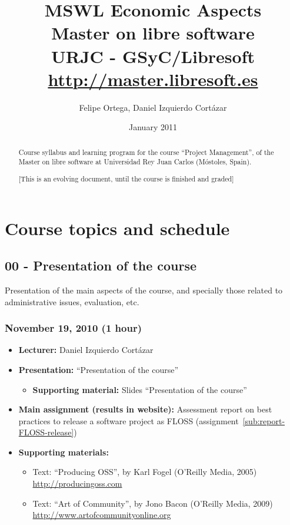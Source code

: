 \documentclass[a4paper]{article}
\title{MSWL Economic Aspects \\
Master on libre software \\
URJC - GSyC/Libresoft \\
\url{http://master.libresoft.es}}
\author{Felipe Ortega, Daniel Izquierdo Cortázar}
\date{January 2011}
\begin{document}
\maketitle

\begin{abstract}
Course syllabus and learning program for the course ``Project Management'', of the Master on libre software at Universidad Rey Juan Carlos (Móstoles, Spain).

[This is an evolving document, until the course is finished and graded]
\end{abstract}

\tableofcontents

\section{Course topics and schedule}

\subsection{00 - Presentation of the course}

Presentation of the main aspects of the course, and specially those related to administrative issues, evaluation, etc.

\subsubsection{November 19, 2010 (1 hour)}

\begin{itemize}
\item \textbf{Lecturer:} Daniel Izquierdo Cortázar
\item \textbf{Presentation:} ``Presentation of the course''
  \begin{itemize}
  \item \textbf{Supporting material:} Slides ``Presentation of the course''
  \end{itemize}
\item \textbf{Main assignment (results in website):} Assessment report on best practices to release a software project as FLOSS (assignment~\ref{sub:report-FLOSS-release})

\item \textbf{Supporting materials:} 
  \begin{itemize}
  \item Text: ``Producing OSS'', by Karl Fogel (O'Reilly Media, 2005)\\
    \url{http://producingoss.com}
  \item Text: ``Art of Community'', by Jono Bacon (O'Reilly Media, 2009)\\
    \url{http://www.artofcommunityonline.org} 
  \end{itemize}
\end{itemize}
\end{document}
